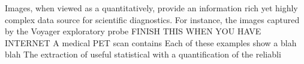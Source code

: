 Images, when viewed as a quantitatively, provide an information rich yet highly complex data source for scientific diagnostics. 
For instance, the images captured by the Voyager exploratory probe  FINISH THIS WHEN YOU HAVE INTERNET
A medical PET scan contains
Each of these examples show a blah blah 
The extraction of useful statistical with a quantification of the reliabli
